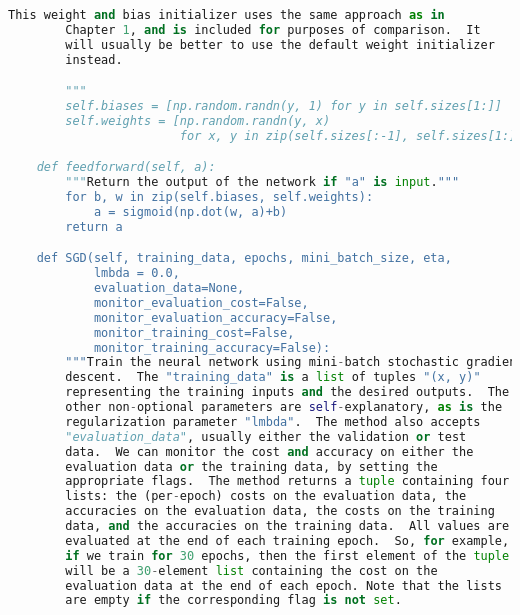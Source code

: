 \begin{fullwidth}
\begin{lstlisting}[caption={network2.py (Python 2.7)},label={lst:network2.py}, language=Python]
        This weight and bias initializer uses the same approach as in
        Chapter 1, and is included for purposes of comparison.  It
        will usually be better to use the default weight initializer
        instead.

        """
        self.biases = [np.random.randn(y, 1) for y in self.sizes[1:]]
        self.weights = [np.random.randn(y, x)
                        for x, y in zip(self.sizes[:-1], self.sizes[1:])]

    def feedforward(self, a):
        """Return the output of the network if "a" is input."""
        for b, w in zip(self.biases, self.weights):
            a = sigmoid(np.dot(w, a)+b)
        return a

    def SGD(self, training_data, epochs, mini_batch_size, eta,
            lmbda = 0.0,
            evaluation_data=None,
            monitor_evaluation_cost=False,
            monitor_evaluation_accuracy=False,
            monitor_training_cost=False,
            monitor_training_accuracy=False):
        """Train the neural network using mini-batch stochastic gradient
        descent.  The "training_data" is a list of tuples "(x, y)"
        representing the training inputs and the desired outputs.  The
        other non-optional parameters are self-explanatory, as is the
        regularization parameter "lmbda".  The method also accepts
        "evaluation_data", usually either the validation or test
        data.  We can monitor the cost and accuracy on either the
        evaluation data or the training data, by setting the
        appropriate flags.  The method returns a tuple containing four
        lists: the (per-epoch) costs on the evaluation data, the
        accuracies on the evaluation data, the costs on the training
        data, and the accuracies on the training data.  All values are
        evaluated at the end of each training epoch.  So, for example,
        if we train for 30 epochs, then the first element of the tuple
        will be a 30-element list containing the cost on the
        evaluation data at the end of each epoch. Note that the lists
        are empty if the corresponding flag is not set.


\end{lstlisting}
\end{fullwidth}
